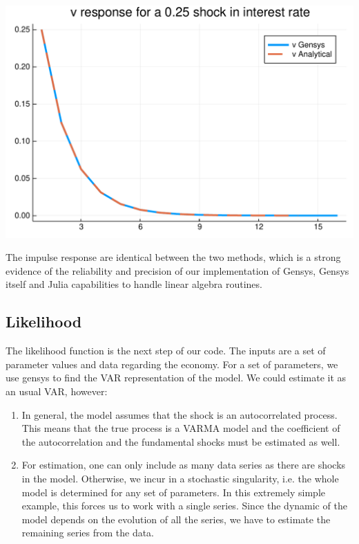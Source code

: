 \documentclass[12pt,a4paper]{article}
\begin{document}
\includegraphics[width=\linewidth]{figures/dsge_and_julia_14_1.pdf}

The impulse response are identical between the two methods, which is a strong evidence of the reliability and precision of our implementation of Gensys, Gensys itself and Julia capabilities to handle linear algebra routines.

\subsection{Likelihood}
The likelihood function is the next step of our code. The inputs are a set of parameter values and data regarding the economy. For a set of parameters, we use gensys to find the VAR representation of the model. We could estimate it as an usual VAR, however:

\begin{enumerate}
	
\item In general, the model assumes that the shock is an autocorrelated process. This means that the true process is a VARMA model and the coefficient of the autocorrelation and the fundamental shocks must be estimated as well.

\item For estimation, one can only include as many data series as there are shocks in the model. Otherwise, we incur in a stochastic singularity, i.e. the whole model is determined for any set of parameters. In this extremely simple example, this forces us to work with a single series. Since the dynamic of the model depends on the evolution of all the series, we have to estimate the remaining series from the data.

\end{enumerate}
\end{document}
